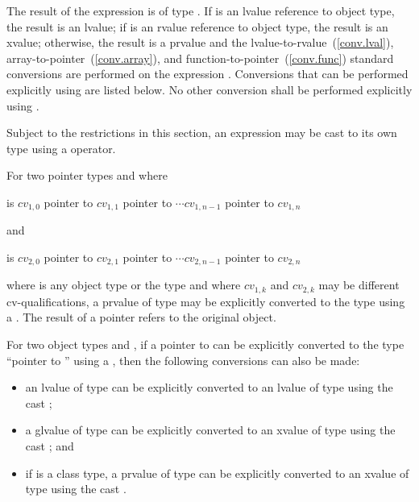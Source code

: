\pnum
{}%
%
The result of the expression  is of type
. If  is an lvalue reference to object type, the result is an
lvalue;
if  is an rvalue reference to object type, the result is an xvalue;
otherwise, the result is a prvalue and the
lvalue-to-rvalue~(\ref{conv.lval}), array-to-pointer~(\ref{conv.array}),
and function-to-pointer~(\ref{conv.func}) standard conversions are
performed on the expression . Conversions that can be performed explicitly using
 are listed below. No other conversion shall be
performed explicitly using .

\pnum
\enternote 
Subject to the restrictions in this section, an expression may be cast
to its own type using a  operator.
\exitnote 

\pnum
For two pointer types  and  where

\begin{indented}
 is $\mathit{cv}_{1,0}$ pointer to $\mathit{cv}_{1,1}$ pointer
to $\cdots \mathit{cv}_{1,n-1}$ pointer to $\mathit{cv}_{1,n}$ 
\end{indented}

and

\begin{indented}
 is $\mathit{cv}_{2,0}$ pointer to $\mathit{cv}_{2,1}$ pointer
to $\cdots \mathit{cv}_{2,n-1}$ pointer to $\mathit{cv}_{2,n}$ 
\end{indented}

where
 is any object type or the  type and where
$\mathit{cv}_{1,k}$ and $\mathit{cv}_{2,k}$ may be different
cv-qualifications, a prvalue of type  may be explicitly
converted to the type  using a . The result
of a pointer  refers to the original object.

\pnum
For two object types  and , if a pointer to  can
be explicitly converted to the type ``pointer to '' using a
, then the following conversions can also be made:

\begin{itemize}
\item an lvalue of type  can be explicitly converted to an lvalue
of type  using the cast ;

\item a glvalue of type  can be explicitly converted to an xvalue
of type  using the cast ; and

\item if  is a class type, a prvalue of type  can be
explicitly converted to an xvalue of type  using the cast
.
\end{itemize}

